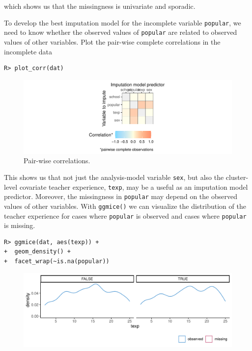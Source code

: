 \documentclass[
  article]{jss}
\begin{document}
which shows us that the missingness is univariate and sporadic.

To develop the best imputation model for the incomplete variable
\texttt{popular}, we need to know whether the observed values of
\texttt{popular} are related to observed values of other variables. Plot
the pair-wise complete correlations in the incomplete data

\begin{verbatim}
R> plot_corr(dat)
\end{verbatim}

\begin{figure}[h]

{\centering \includegraphics{manuscript_files/figure-pdf/unnamed-chunk-10-1.pdf}

}

\caption{Pair-wise correlations.}

\end{figure}

This shows us that not just the analysis-model variable \texttt{sex},
but also the cluster-level covariate teacher experience, \texttt{texp},
may be a useful as an imputation model predictor. Moreover, the
missingness in \texttt{popular} may depend on the observed values of
other variables. With \texttt{ggmice()} we can visualize the
distribution of the teacher experience for cases where \texttt{popular}
is observed and cases where \texttt{popular} is missing.

\begin{verbatim}
R> ggmice(dat, aes(texp)) + 
+  geom_density() +
+  facet_wrap(~is.na(popular))
\end{verbatim}

\begin{figure}[h]

{\centering \includegraphics{manuscript_files/figure-pdf/unnamed-chunk-11-1.pdf}

}

\end{figure}
\end{document}
